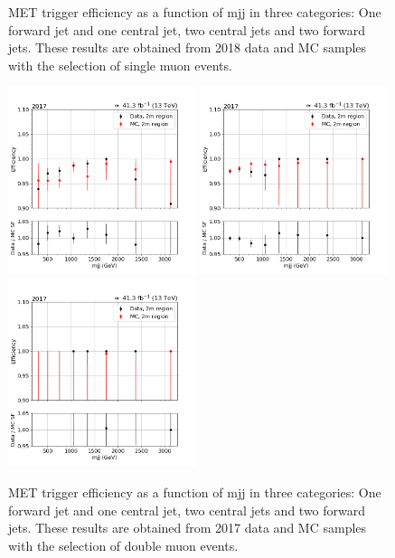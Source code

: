\begin{figure}[hbp]
\begin{center}
    \end{center}
    \caption{MET trigger efficiency as a function of mjj in three categories: One forward jet and one central jet, two central jets and
            two forward jets. These results are obtained from 2018 data and MC samples with the selection of single muon events.}   
    \label{fig:eff_mjj_2018_1m}
\end{figure}

\begin{figure}[htp]
    \begin{center}
        \includegraphics[width=0.49\textwidth]{fig/efficiency/trigger/met/mjj/data_mc_comparison_2m_2017_one_jet_forward_one_jet_central.png}
        \includegraphics[width=0.49\textwidth]{fig/efficiency/trigger/met/mjj/data_mc_comparison_2m_2017_two_central_jets.png} \\
        \includegraphics[width=0.49\textwidth]{fig/efficiency/trigger/met/mjj/data_mc_comparison_2m_2017_two_forward_jets.png}
    \end{center}
    \caption{MET trigger efficiency as a function of mjj in three categories: One forward jet and one central jet, two central jets and
            two forward jets. These results are obtained from 2017 data and MC samples with the selection of double muon events.}
    \label{fig:eff_mjj_2017_2m}
\end{figure}


